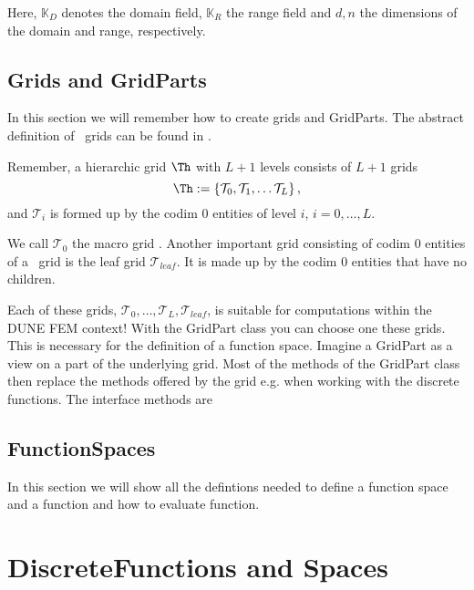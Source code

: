   Here, $\mathbb{K}_D$ denotes the domain field, $\mathbb{K}_R$ the range field and  $d,n$ the dimensions of the domain and range, respectively. 


  \section{Grids and GridParts}

  In this section we will remember how to create grids and GridParts. The abstract definition of \Dune\ grids can be found  in \citep{GitterPapier:06}. 

  Remember, a hierarchic grid $\Th$ with $L+1$ levels consists of $L+1$ grids 
  $$\Th := \left\{\mathcal{T}_0, \mathcal{T}_1, \ldots \mathcal{T}_L\right\},$$
  and $\mathcal{T}_i$ is formed up by the codim 0 entities of level $i$, $i=0,\ldots,L$. 

  We call $\mathcal{T}_0$ the macro grid . Another important grid consisting of codim 0 entities of a \Dune\ grid is the leaf grid  $\mathcal{T}_{leaf}$. It is made up by the codim 0 entities that have no children.  

  Each of these grids, $\mathcal{T}_0, \ldots, \mathcal{T}_L, \mathcal{T}_{leaf}$, is suitable for computations within the DUNE FEM context! With the GridPart class you can choose one these grids. This is necessary for the definition of a function space. Imagine a GridPart as a view on a part of the underlying grid. Most of the methods of the GridPart class then replace the methods offered by the grid e.g. when working with the discrete functions. The interface methods are
 

\section{FunctionSpaces}

  In this section we will show all the defintions needed to define a function space and a function and how to evaluate function.


\chapter{DiscreteFunctions and Spaces}




